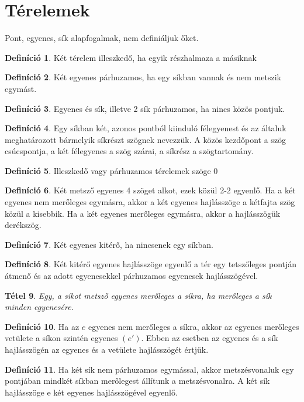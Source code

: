 \documentclass[twoside,12pt]{report}
\newtheorem{theorem}{Tétel}[section]
\theoremstyle{definition}
\newtheorem{definition}[theorem]{Definíció}
\begin{document}
\section{Térelemek}
	Pont, egyenes, sík alapfogalmak, nem definiáljuk őket.
	\begin{definition}
		Két térelem illeszkedő, ha egyik részhalmaza a másiknak
	\end{definition}
	\begin{definition}
		Két egyenes párhuzamos, ha egy síkban vannak és nem metszik egymást.
	\end{definition}
	\begin{definition}
		Egyenes és sík, illetve 2 sík párhuzamos, ha nincs közös pontjuk.
	\end{definition}
	\begin{definition}
		Egy síkban két, azonos pontból kiinduló félegyenest és az általuk meghatározott bármelyik síkrészt szögnek nevezzük. A közös kezdőpont a szög csúcspontja, a két félegyenes a szög szárai, a síkrész a szögtartomány.
	\end{definition}
	\begin{definition}
		Illeszkedő vagy párhuzamos térelemek szöge 0\degree
	\end{definition}
	\begin{definition}
		Két metsző egyenes 4 szöget alkot, ezek közül 2-2 egyenlő. Ha a két egyenes nem merőleges egymásra, akkor a két egyenes hajlásszöge a kétfajta szög közül a kisebbik. Ha a két egyenes merőleges egymásra, akkor a hajlásszögük derékszög.
	\end{definition}
	\begin{definition}
		Két egyenes kitérő, ha nincsenek egy síkban.
	\end{definition}
	\begin{definition}
		Két kitérő egyenes hajlásszöge egyenlő a tér egy tetszőleges pontján átmenő és az adott egyenesekkel párhuzamos egyenesek hajlásszögével.
	\end{definition}
	\begin{theorem}
		Egy, a síkot metsző egyenes merőleges a síkra, ha merőleges a sík minden egyenesére.
	\end{theorem}
	\begin{definition}
		Ha az $e$ egyenes nem merőleges a síkra, akkor az egyenes merőleges vetülete a síkon
		szintén egyenes $(e')$. Ebben az esetben az egyenes és a sík hajlásszögén az egyenes és a vetülete hajlásszögét értjük.
	\end{definition}
	\begin{definition}
		Ha két sík nem párhuzamos egymással, akkor metszésvonaluk egy pontjában mindkét síkban merőlegest állítunk a metszésvonalra. A két sík hajlásszöge e két egyenes hajlásszögével egyenlő.
	\end{definition}
\end{document}
